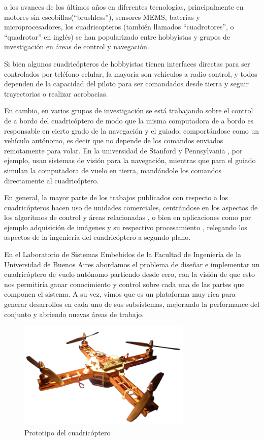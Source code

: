 \documentclass[a4paper, conference]{IEEEtran}
\begin{document}
 a los avances de los últimos años en diferentes tecnologías, principalmente en motores sin escobillas(``brushless''), sensores MEMS, baterías y microprocesadores, los cuadricopteros (también llamados ``cuadrotores'', o ``quadrotor'' en inglés) se han popularizado entre hobbyistas y grupos de investigación en áreas de control y navegación.

Si bien algunos cuadricópteros de hobbyistas \cite{parrot} tienen interfaces directas para ser controlados por teléfono celular, la mayoría son vehículos a radio control, y todos dependen de la capacidad del piloto para ser comandados desde tierra y seguir trayectorias o realizar acrobacias. 

En cambio, en varios grupos de investigación se está trabajando sobre el control de a bordo del cuadricóptero de modo que la misma computadora de a bordo es responsable en cierto grado de la navegación y el guiado, comportándose como un vehículo autónomo, es decir que no depende de los comandos enviados remotamente para volar. En la universidad de Stanford \cite{starmac} y Pennsylvania \cite{grasp}, por ejemplo, usan sistemas de visión para la navegación, mientras que para el guiado simulan la computadora de vuelo en tierra, mandándole los comandos directamente al cuadricóptero.

En general, la mayor parte de los trabajos publicados con respecto a los cuadricópteros hacen uso de unidades comerciales, centrándose en los aspectos de los algoritmos de control y áreas relacionadas \cite{starmac} \cite{grasp}, o bien en aplicaciones como por ejemplo adquisición de imágenes y su respectivo procesamiento \cite{grasp}, relegando los aspectos de la ingeniería del cuadricóptero a segundo plano. 

En el Laboratorio de Sistemas Embebidos de la Facultad de Ingeniería de la Universidad de Buenos Aires abordamos el problema de diseñar e implementar un cuadricóptero de vuelo autónomo partiendo desde cero, con la visión de que esto nos permitiría ganar conocimiento y control sobre cada una de las partes que componen el sistema. A su vez, vimos que es un plataforma muy rica para generar desarrollos en cada uno de sus subsistemas, mejorando la performance del conjunto y abriendo nuevas áreas de trabajo.

\begin{figure}[!t]
\centering
\includegraphics[width=3.25in]{foto_quad.png}
\caption{Prototipo del cuadricóptero}
\label{ref:quadfoto}
\end{figure}
\end{document}
